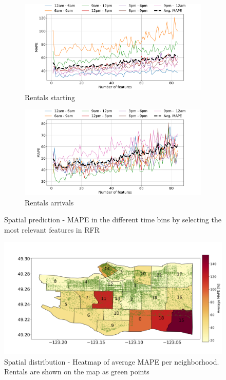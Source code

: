 \begin{figure}
    \begin{center}
         \begin{subfigure}{0.65\textwidth}
             \includegraphics[width=\columnwidth]{figures/spatial_analyses/LC_rfr_True_start.pdf}
             \caption{Rentals starting
             \vspace{0.5cm}}
             \label{fig:8_5_rfr_start_err_lc}
         \end{subfigure}
         \begin{subfigure}{0.65\textwidth}
             \includegraphics[width=\columnwidth]{figures/spatial_analyses/LC_rfr_True_final.pdf}
             \caption{Rentals arrivals}
             \label{fig:8_5_rfr_final_err_lc}
         \end{subfigure}         
 	\caption{Spatial prediction - MAPE in the different time bins by selecting the most relevant features in RFR}
    \label{fig:8_5_reg_err_perc_LC}
\end{center}
\end{figure}


\begin{figure}
    \begin{center}
        \includegraphics[width=0.7\columnwidth]{figures/spatial_analyses/error_distirbution_map.png}
     	\caption{Spatial distribution - Heatmap of average MAPE per neighborhood. Rentals are shown on the map as green points}
        \label{fig:8_5_error_distributiion}
    \end{center}
\end{figure}